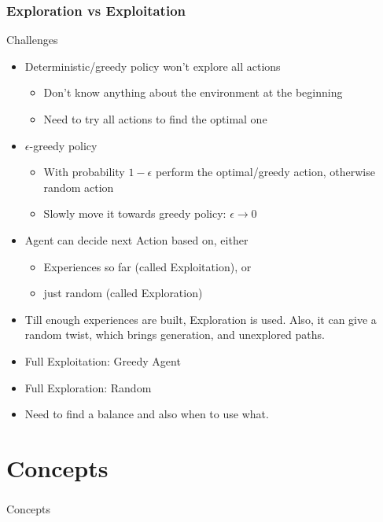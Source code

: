 \begin{frame}[fragile]\frametitle{Exploration vs Exploitation}

Challenges

\begin{itemize}
\item Deterministic/greedy policy won’t explore all actions
	\begin{itemize}
	\item Don’t know anything about the environment at the beginning
	\item Need to try all actions to find the optimal one
	\end{itemize}

\item $\epsilon$-greedy policy
	\begin{itemize}
	\item	With probability $1-\epsilon$ perform the optimal/greedy action, otherwise random action
	\item	Slowly move it towards greedy policy: $\epsilon \rightarrow 0$
	\end{itemize}
\item Agent can decide next Action based on, either
	\begin{itemize}
	\item Experiences so far (called Exploitation), or
	\item just random (called Exploration)
	\end{itemize}
\item Till enough experiences are built, Exploration is used. Also, it can give a random twist, which brings generation, and unexplored paths.
\item Full Exploitation: Greedy Agent
\item Full Exploration: Random
\item Need to find a balance and also when to use what.
\end{itemize}
\end{frame}


\section[Concepts]{Concepts}

\begin{frame}[fragile]\frametitle{}
\begin{center}
{\Large Concepts}
\end{center}
\end{frame}


